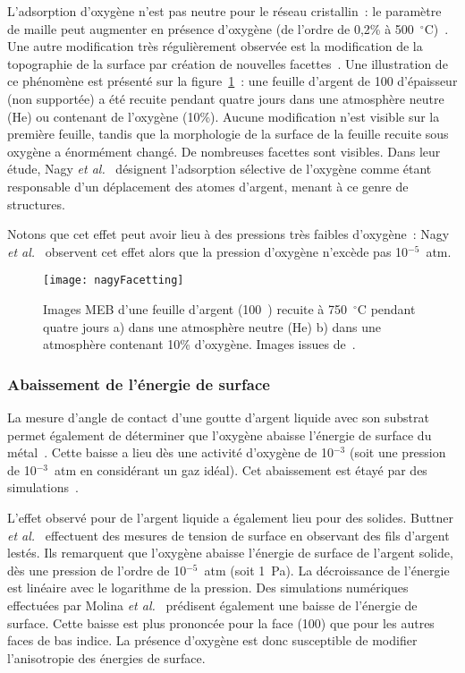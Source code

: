 L'adsorption d'oxygène n'est pas neutre pour le réseau cristallin~: le paramètre de maille peut augmenter en présence d'oxygène (de l'ordre de 0,2\% à 500~$^\circ$C)~\cite{nagy1999correlation}. Une autre modification très régulièrement observée est la modification de la topographie de la surface par création de nouvelles facettes~\cite{buttner1952adsorption, nagy1999correlation, engelhardt1976adsorption, yoshihara1979effect}. Une illustration de ce phénomène est présenté sur la figure~\ref{nagyFacetting}~: une feuille d'argent de 100 \micro\meter{} d'épaisseur (non supportée) a été recuite pendant quatre jours dans une atmosphère neutre (He) ou contenant de l'oxygène (10\%). Aucune modification n'est visible sur la première feuille, tandis que la morphologie de la surface de la feuille recuite sous oxygène a énormément changé. De nombreuses facettes sont visibles. Dans leur étude, Nagy \textit{et al.}~\cite{nagy1999correlation} désignent l'adsorption sélective de l'oxygène comme étant responsable d'un déplacement des atomes d'argent, menant à ce genre de structures.\par 
Notons que cet effet peut avoir lieu à des pressions très faibles d'oxygène~: Nagy \textit{et al.}~\cite{nagy1999correlation} observent cet effet alors que la pression d'oxygène n'excède pas 10$^{-5}$~atm.\par 
\begin{figure}[!htb]
	\centering
	\texttt{[image: nagyFacetting]}
	\caption{Images MEB d'une feuille d'argent (100~\micro\meter) recuite à 750~$^\circ$C pendant quatre jours a) dans une atmosphère neutre (He) b) dans une atmosphère contenant 10\% d'oxygène. Images issues de~\cite{nagy1999correlation}.}
	\label{nagyFacetting}
\end{figure}

		\subsubsection{Abaissement de l'énergie de surface}
La mesure d'angle de contact d'une goutte d'argent liquide avec son substrat permet également de déterminer que l'oxygène abaisse l'énergie de surface du métal~\cite{chatain94}. Cette baisse a lieu dès une activité d'oxygène de 10$^{-3}$ (soit une pression de 10$^{-3}$~atm en considérant un gaz idéal). Cet abaissement est étayé par des simulations~\cite{muolo08}.\par 
L'effet observé pour de l'argent liquide a également lieu pour des solides. Buttner \textit{et al.}~\cite{buttner1952adsorption} effectuent des mesures de tension de surface en observant des fils d'argent lestés. Ils remarquent que l'oxygène abaisse l'énergie de surface de l'argent solide, dès une pression de l'ordre de 10$^{-5}$~atm (soit 1~Pa). La décroissance de l'énergie est linéaire avec le logarithme de la pression. Des simulations numériques effectuées par Molina \textit{et al.}~\cite{molina2011size} prédisent également une baisse de l'énergie de surface. Cette baisse est plus prononcée pour la face (100) que pour les autres faces de bas indice. La présence d'oxygène est donc susceptible de modifier l'anisotropie des énergies de surface.\par 

